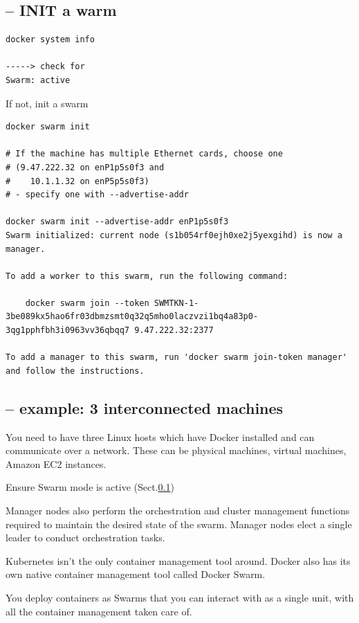\subsection{-- INIT a warm}
\label{sec:Docker-swarm-init}

\begin{verbatim}
docker system info

-----> check for 
Swarm: active
\end{verbatim}
If not, init a swarm
\begin{verbatim}
docker swarm init

# If the machine has multiple Ethernet cards, choose one
# (9.47.222.32 on enP1p5s0f3 and 
#    10.1.1.32 on enP5p5s0f3) 
# - specify one with --advertise-addr

docker swarm init --advertise-addr enP1p5s0f3
Swarm initialized: current node (s1b054rf0ejh0xe2j5yexgihd) is now a manager.

To add a worker to this swarm, run the following command:

    docker swarm join --token SWMTKN-1-3be089kx5hao6fr03dbmzsmt0q32q5mho0laczvzi1bq4a83p0-3qg1pphfbh3i0963vv36qbqq7 9.47.222.32:2377

To add a manager to this swarm, run 'docker swarm join-token manager' and follow the instructions.

\end{verbatim}

\subsection{-- example: 3 interconnected machines}

You need to have  three Linux hosts which have Docker installed and can
communicate over a network. These can be physical machines, virtual machines,
Amazon EC2 instances.

Ensure Swarm mode is active (Sect.\ref{sec:Docker-swarm-init})


Manager nodes also perform the orchestration and cluster management functions
required to maintain the desired state of the swarm. Manager nodes elect a
single leader to conduct orchestration tasks.


Kubernetes isn’t the only container management tool around.
Docker also has its own native container management tool called Docker Swarm. 


You deploy containers as Swarms that you can interact with as a single unit,
with all the container management taken care of.



